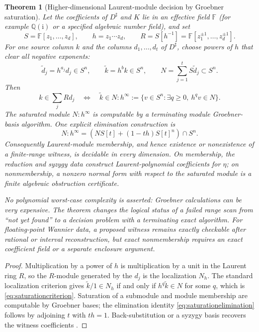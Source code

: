 \documentclass[11pt]{article}
\newtheorem{theorem}{Theorem}[section]
\theoremstyle{definition}
\theoremstyle{remark}
\newcommand{\I}{\mathrm i}
\begin{document}
\begin{theorem}[Higher-dimensional Laurent-module decision by Groebner saturation]
\label{thm:groebner}
Let the coefficients of $D^\sharp$ and $K$ lie in an effective field $\mathbb F$ (for example $\mathbb Q(\I)$ or a specified algebraic number field), and set
\[
 S=\mathbb F[z_1,\ldots,z_d],
 \qquad h=z_1\cdots z_d,
 \qquad R=S[h^{-1}]
   =\mathbb F[z_1^{\pm1},\ldots,z_d^{\pm1}].
\]
For one source column $k$ and the columns $d_1,\ldots,d_t$ of $D^\sharp$, choose powers of $h$ that clear all negative exponents:
\[
 \widetilde d_j=h^{a_j}d_j\in S^n,
 \qquad
 \widetilde k=h^b k\in S^n,
 \qquad
 N=\sum_{j=1}^t S\widetilde d_j\subset S^n.
\]
Then
\begin{equation}
 k\in\sum_jR d_j
 \quad\Longleftrightarrow\quad
 \widetilde k\in N:h^\infty
 :=\{v\in S^n:\exists q\ge0,\ h^qv\in N\}.
 \label{eq:saturationcriterion}
\end{equation}
The saturated module $N:h^\infty$ is computable by a terminating module Groebner-basis algorithm.  One explicit elimination construction is
\begin{equation}
 N:h^\infty
 =\left(
 N S[t]+(1-th)S[t]^n
 \right)\cap S^n.
 \label{eq:saturationelimination}
\end{equation}
Consequently Laurent-module membership, and hence existence or nonexistence of a finite-range witness, is decidable in every dimension.  On membership, the reduction and syzygy data construct Laurent-polynomial coefficients for $\eta$; on nonmembership, a nonzero normal form with respect to the saturated module is a finite algebraic obstruction certificate.

No polynomial worst-case complexity is asserted: Groebner calculations can be very expensive.  The theorem changes the logical status of a failed range scan from ``not yet found'' to a decision problem with a terminating exact algorithm.  For floating-point Wannier data, a proposed witness remains exactly checkable after rational or interval reconstruction, but exact nonmembership requires an exact coefficient field or a separate enclosure argument.
\end{theorem}

\begin{proof}
Multiplication by a power of $h$ is multiplication by a unit in the Laurent ring $R$, so the $R$-module generated by the $d_j$ is the localization $N_h$.  The standard localization criterion gives $\widetilde k/1\in N_h$ if and only if $h^q\widetilde k\in N$ for some $q$, which is \eqref{eq:saturationcriterion}.  Saturation of a submodule and module membership are computable by Groebner bases; the elimination identity \eqref{eq:saturationelimination} follows by adjoining $t$ with $th=1$.  Back-substitution or a syzygy basis recovers the witness coefficients \cite{CoxLittleOShea,Eisenbud,AdamsLoustaunau}.
\end{proof}
\end{document}
